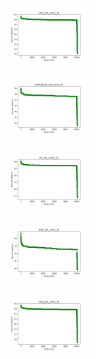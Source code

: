 \begin{figure}[H]
    \begin{subfigure}
        \centering
        \includegraphics[width=0.234\textwidth]{img/HS-LS/rand_set_const_10_277451237_cost.png}
    \end{subfigure}
    \hfill
    \begin{subfigure}
        \centering
        \includegraphics[width=0.234\textwidth]{img/HS-LS/newthyroid_set_const_10_277451237_cost.png}
    \end{subfigure}
    \hfill
    \begin{subfigure}
        \centering
        \includegraphics[width=0.234\textwidth]{img/HS-LS/iris_set_const_10_49258669_cost.png}
    \end{subfigure}
    \hfill
    \begin{subfigure}
        \centering
        \includegraphics[width=0.234\textwidth]{img/HS-LS/ecoli_set_const_10_49258669_cost.png}
    \end{subfigure}
    \hfill
    \begin{subfigure}
        \centering
        \includegraphics[width=0.234\textwidth]{img/HS-LS/rand_set_const_10_49258669_cost.png}
    \end{subfigure}
    \hfill
    \begin{subfigure}
        \centering

\end{subfigure}
\end{figure}
